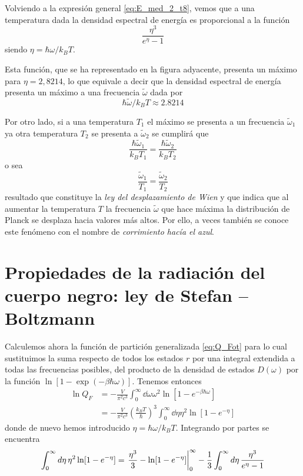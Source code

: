 Volviendo a la expresión general \eqref{eq:E_med_2_t8}, vemos que a una temperatura dada la densidad espectral de energía es proporcional a la función
\begin{equation}
	\frac{\eta^3}{e^{\eta} - 1}
\end{equation}
siendo $\eta = \hbar\omega / k_BT$.

\begin{figure}[h]
	\centering
	
\end{figure}
Esta función, que se ha representado en la figura adyacente, presenta un máximo para $\eta = 2,8214$, lo que equivale a decir que la densidad espectral de energía presenta un máximo a una frecuencia $\widetilde{\omega}$ dada por
\begin{equation}
	\hbar\widetilde{\omega}/k_B T \approx 2.8214
\end{equation}

Por otro lado, si a una temperatura $T_1$ el máximo se presenta a un frecuencia $\widetilde{\omega}_1$ ya otra temperatura $T_2$ se presenta a $\widetilde{\omega}_2$ se cumplirá que
\begin{equation}
	\frac{\hbar\widetilde{\omega}_1}{k_B T_1} = \frac{\hbar\widetilde{\omega}_2}{k_B T_2}
\end{equation}
o sea
\begin{equation}
	\frac{\widetilde{\omega}_1}{T_1} = \frac{\widetilde{\omega}_2}{T_2}
\end{equation}
resultado que constituye la \emph{ley del desplazamiento de Wien} y que indica que al aumentar la temperatura $T$ la frecuencia $\widetilde{\omega}$ que hace máxima la distribución de Planck se desplaza hacia valores más altos.
Por ello, a veces también se conoce este fenómeno con el nombre de \emph{corrimiento hacía el azul}.

\section{Propiedades de la radiación del cuerpo negro: ley de Stefan – Boltzmann}

Calculemos ahora la función de partición generalizada \eqref{eq:Q_Fot} para lo cual sustituimos la suma respecto de todos los estados $r$ por una integral extendida a todas las frecuencias posibles, del producto de la densidad de estados $D(\omega)$ por la función $\ln [1 - \exp(-\beta\hbar\omega)]$.
Tenemos entonces
\begin{align}
	\ln Q_F &= -\frac{V}{\pi^2 c^3} \int_0^\infty \dd{\omega} \omega^2 \ln [1 - e^{-\beta\hbar\omega}] \nonumber \\
			&= -\frac{V}{\pi^2 c^3} \left( \frac{k_B T}{\hbar} \right)^3 \int_0^\infty \dd{\eta} \eta^2 \ln [1 - e^{-\eta}]
\end{align}
donde de nuevo hemos introducido $\eta = \hbar\omega / k_BT$.
Integrando por partes se encuentra
\begin{equation}
	\int_0^\infty \dd{\eta} \eta^2 \ln [1 - e^{-\eta}] = \eval{\frac{\eta^3}{3} - \ln [1 - e^{-\eta}]}_{0}^{\infty} - \frac{1}{3} \int_0^\infty \dd{\eta} \frac{\eta^3}{e^{\eta} - 1}
\end{equation}

